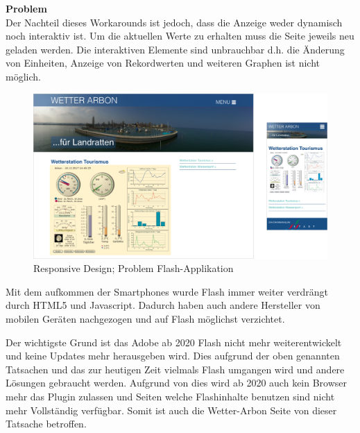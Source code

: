 \textbf{Problem}\\
Der Nachteil dieses Workarounds ist jedoch, dass die Anzeige weder dynamisch noch interaktiv ist. Um die aktuellen Werte zu erhalten muss die Seite jeweils neu geladen werden. Die interaktiven Elemente sind unbrauchbar d.h. die Änderung von Einheiten, Anzeige von Rekordwerten und weiteren Graphen ist nicht möglich.

\begin{figure}[h!]
	\centering
	\includegraphics[width=1\linewidth]{img/responsive}
	\caption{Responsive Design; Problem Flash-Applikation}
	\label{img:responsive}
\end{figure}



Mit dem aufkommen der Smartphones wurde Flash immer weiter verdrängt durch HTML5 und Javascript. Dadurch haben auch andere Hersteller von mobilen Geräten nachgezogen und auf Flash möglichst verzichtet. 

Der wichtigste Grund ist das Adobe ab 2020 Flash nicht mehr weiterentwickelt und keine Updates mehr herausgeben wird. Dies aufgrund der oben genannten Tatsachen und das zur heutigen Zeit vielmals Flash umgangen wird und andere Lösungen gebraucht werden. Aufgrund von dies wird ab 2020 auch kein Browser mehr das Plugin zulassen und Seiten welche Flashinhalte benutzen sind nicht mehr Vollständig verfügbar. Somit ist auch die Wetter-Arbon Seite von dieser Tatsache betroffen. \cite{Adobe:FlashTheFutureofInteractiveContent}\\


